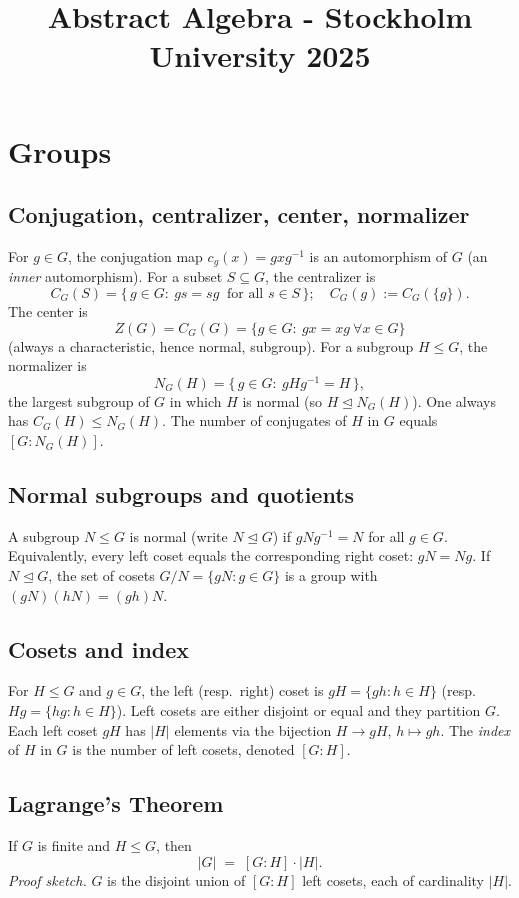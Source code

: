 \documentclass[12pt]{article}
\title{Abstract Algebra - Stockholm University 2025}
\author{}
\date{}
\begin{document}
\maketitle

\section{Groups}
\subsection{Conjugation, centralizer, center, normalizer}
For $g\in G$, the conjugation map $c_g(x)=gxg^{-1}$ is an automorphism of $G$ (an \emph{inner} automorphism).
For a subset $S\subseteq G$, the centralizer is
\[
C_G(S)=\{\,g\in G:\ gs=sg\ \text{ for all }s\in S\,\};\quad C_G(g):=C_G(\{g\}).
\]
The center is 
\[ 
    Z(G)=C_G(G)=\{g\in G:\ gx=xg\ \forall x\in G\}
\]
(always a characteristic, hence normal, subgroup).
For a subgroup $H\le G$, the normalizer is
\[
N_G(H)=\{\,g\in G:\ gHg^{-1}=H\,\},
\]
the largest subgroup of $G$ in which $H$ is normal (so $H\trianglelefteq N_G(H)$). One always has $C_G(H)\le N_G(H)$.
The number of conjugates of $H$ in $G$ equals $[G:N_G(H)]$.

\subsection{Normal subgroups and quotients}
A subgroup $N\le G$ is normal (write $N\trianglelefteq G$) if $gNg^{-1}=N$ for all $g\in G$.
Equivalently, every left coset equals the corresponding right coset: $gN=Ng$.
If $N\trianglelefteq G$, the set of cosets $G/N=\{gN:g\in G\}$ is a group with $(gN)(hN)=(gh)N$.

\subsection{Cosets and index}
For $H\le G$ and $g\in G$, the left (resp.\ right) coset is
$gH=\{gh:h\in H\}$ (resp.\ $Hg=\{hg:h\in H\}$).
Left cosets are either disjoint or equal and they partition $G$.
Each left coset $gH$ has $|H|$ elements via the bijection $H\to gH$, $h\mapsto gh$.
The \emph{index} of $H$ in $G$ is the number of left cosets, denoted $[G\!:\!H]$.

\subsection{Lagrange's Theorem}
If $G$ is finite and $H\le G$, then
\[
|G| \;=\; [G\!:\!H]\cdot |H|.
\]
\emph{Proof sketch.} $G$ is the disjoint union of $[G\!:\!H]$ left cosets, each of cardinality $|H|$.
\end{document}
